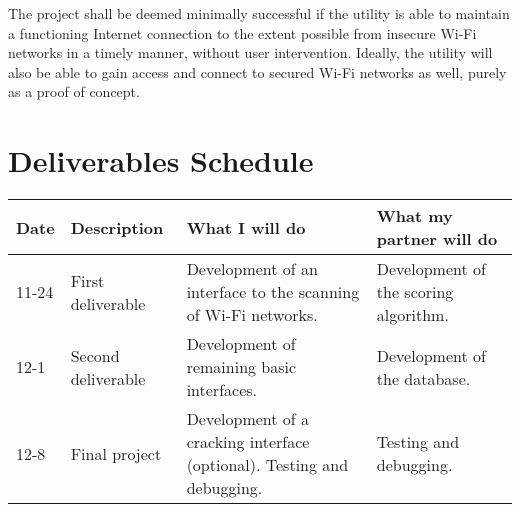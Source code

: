 \documentclass{article}
\begin{document}
The project shall be deemed minimally successful if the utility is able to
maintain a functioning Internet connection to the extent possible from insecure
Wi-Fi networks in a timely manner, without user intervention. Ideally, the
utility will also be able to gain access and connect to secured Wi-Fi networks
as well, purely as a proof of concept.

\section{Deliverables Schedule}
\begin{tabular}[t]{|l|p{.15\linewidth}|p{.3\linewidth}|p{.3\linewidth}|}
  \hline
  Date & Description & What I will do & What my partner will do\\\hline
  11-24 & First deliverable & Development of an interface to the scanning of
  Wi-Fi networks. & Development of the scoring algorithm.\\\hline
  12-1 & Second deliverable & Development of remaining basic interfaces. &
  Development of the database.\\\hline
  12-8 & Final project & Development of a cracking interface (optional). Testing
  and debugging. & Testing and debugging.\\\hline
\end{tabular}
\end{document}
